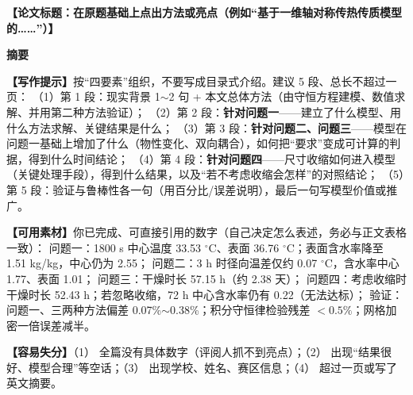 \documentclass[12pt,a4paper]{article}
\newcommand{\prompt}[1]{\par\noindent\textbf{【写作提示】}#1\par}      %
\newcommand{\material}[1]{\par\noindent\textbf{【可用素材】}#1\par}    %
\newcommand{\pitfall}[1]{\par\noindent\textbf{【容易失分】}#1\par}     %
\newcommand{\ph}[1]{\textbf{【#1】}}                                   %
\begin{document}

\setcounter{page}{1}

\begin{center}
{\bfseries \ph{论文标题：在原题基础上点出方法或亮点（例如“基于一维轴对称传热传质模型的……”）}}

\vspace{2ex}
{\bfseries 摘\quad 要}
\end{center}

\prompt{按“四要素”组织，不要写成目录式介绍。建议 5 段、总长不超过一页：
（1）第 1 段：现实背景 1$\sim$2 句 + 本文总体方法（由守恒方程建模、数值求解、并用第二种方法验证）；
（2）第 2 段：\textbf{针对问题一}——建立了什么模型、用什么方法求解、关键结果是什么；
（3）第 3 段：\textbf{针对问题二、问题三}——模型在问题一基础上增加了什么（物性变化、双向耦合），如何把“要求”变成可计算的判据，得到什么时间结论；
（4）第 4 段：\textbf{针对问题四}——尺寸收缩如何进入模型（关键处理手段），得到什么结果，以及“若不考虑收缩会怎样”的对照结论；
（5）第 5 段：验证与鲁棒性各一句（用百分比/误差说明），最后一句写模型价值或推广。}

\material{你已完成、可直接引用的数字（自己决定怎么表述，务必与正文表格一致）：
问题一：1800 s 中心温度 33.53 $^\circ$C、表面 36.76 $^\circ$C；表面含水率降至 1.51 kg/kg，中心仍为 2.55；
问题二：3 h 时径向温差仅约 0.07 $^\circ$C，含水率中心 1.77、表面 1.01；
问题三：干燥时长 57.15 h（约 2.38 天）；
问题四：考虑收缩时干燥时长 52.43 h；若忽略收缩，72 h 中心含水率仍有 0.22（无法达标）；
验证：问题一、三两种方法偏差 0.07\%$\sim$0.38\%；积分守恒律检验残差 $<0.5\%$；网格加密一倍误差减半。}

\pitfall{（1） 全篇没有具体数字（评阅人抓不到亮点）；（2） 出现“结果很好、模型合理”等空话；（3） 出现学校、姓名、赛区信息；（4） 超过一页或写了英文摘要。}
\end{document}
